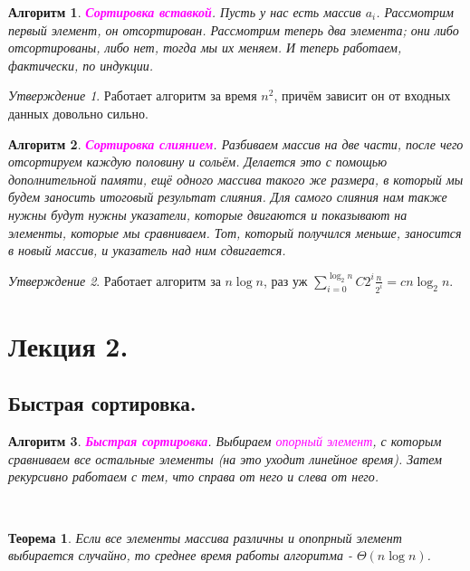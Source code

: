 \documentclass[a4paper]{article}
\theoremstyle{indented}
\newtheorem{theorem}{Теорема}
\newtheorem{alg}{Алгоритм}
\theoremstyle{definition}
\theoremstyle{remark}
\newtheorem{stat}{Утверждение}
\begin{document}
\begin{alg}
    \textcolor{magenta}{\hypertarget{t-3}{\textbf{Сортировка вставкой}}}. Пусть у нас есть массив $a_i$. Рассмотрим первый элемент, он отсортирован. Рассмотрим теперь два элемента; они либо отсортированы, либо нет, тогда мы их меняем. И теперь работаем, фактически, по индукции. 
\end{alg}

\begin{stat}
    Работает алгоритм за время $n^2$, причём зависит он от входных данных довольно сильно.
\end{stat}

\begin{alg}
    \textcolor{magenta}{\hypertarget{t-4}{\textbf{Сортировка слиянием}}}. Разбиваем массив на две части, после чего отсортируем каждую половину и сольём. Делается это с помощью дополнительной памяти, ещё одного массива такого же размера, в который мы будем заносить итоговый результат слияния. Для самого слияния нам также нужны будут нужны указатели, которые двигаются и показывают на элементы, которые мы сравниваем. Тот, который получился меньше, заносится в новый массив, и указатель над ним сдвигается.
\end{alg}

\begin{stat}
    Работает алгоритм за $n\log n$, раз уж $\sum_{i=0}^{\log_2 n} C 2^i \frac{n}{2^i}=c n \log_2 n$. 
\end{stat}

\section{Лекция 2.}

\subsection{Быстрая сортировка.}

\begin{alg}
    \textcolor{magenta}{\hypertarget{r1}{\textbf{Быстрая сортировка}}}. Выбираем \textcolor{magenta}{\hypertarget{d1}{\textit{опорный элемент}}}, с которым сравниваем все остальные элементы (на это уходит линейное время). Затем рекурсивно работаем с тем, что справа от него и слева от него.
\end{alg} \ 

\begin{theorem}
    Если все элементы массива различны и опопрный элемент выбирается случайно, то среднее время работы алгоритма - $\Theta(n\log n)$.
\end{theorem}
\end{document}
